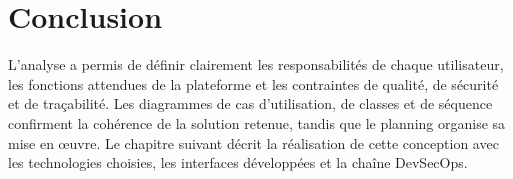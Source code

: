 \section*{Conclusion}
L'analyse a permis de définir clairement les responsabilités de chaque utilisateur, les fonctions attendues de la plateforme et les contraintes de qualité, de sécurité et de traçabilité. Les diagrammes de cas d'utilisation, de classes et de séquence confirment la cohérence de la solution retenue, tandis que le planning organise sa mise en œuvre. Le chapitre suivant décrit la réalisation de cette conception avec les technologies choisies, les interfaces développées et la chaîne DevSecOps.
